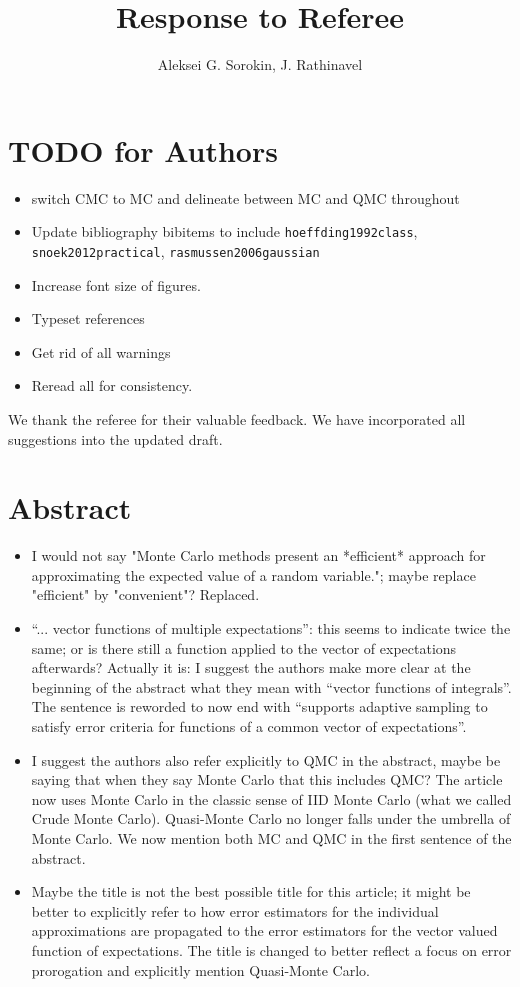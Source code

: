 \documentclass{article}[12pt]
\title{Response to Referee}
\author{Aleksei G. Sorokin, J. Rathinavel}
\date{}
\newcommand{\Referee}[1]{{\color{blue} #1 \newline}}
\newcommand{\MISCComment}[1]{{\color{purple} #1}}
\begin{document}
\maketitle    

\MISCComment{
    \section*{TODO for Authors}
    \begin{itemize}
        \item switch CMC to MC and delineate between MC and QMC throughout
        \item Update bibliography bibitems to include \texttt{hoeffding1992class}, \texttt{snoek2012practical}, \texttt{rasmussen2006gaussian}
        \item Increase font size of figures. 
        \item Typeset references 
        \item Get rid of all warnings 
        \item Reread all for consistency. 
    \end{itemize}}

We thank the referee for their valuable  feedback. We have incorporated all suggestions into the updated draft. 

\section*{Abstract}

\begin{itemize}
    \item \Referee{I would not say "Monte Carlo methods present an *efficient* approach for approximating the expected value of a random variable."; maybe replace "efficient" by "convenient"?}Replaced.
    \item \Referee{``... vector functions of multiple expectations'': this seems to indicate twice the same; or is there still a function applied to the vector of expectations afterwards? Actually it is: I suggest the authors make more clear at the beginning of the abstract what they mean with ``vector functions of integrals''.}The sentence is reworded to now end with ``supports adaptive sampling to satisfy error criteria for functions of a common vector of expectations''.
    \item \Referee{I suggest the authors also refer explicitly to QMC in the abstract, maybe be saying that when they say Monte Carlo that this includes QMC?}The article  now uses Monte Carlo in the classic sense of IID Monte Carlo (what we called Crude Monte Carlo). Quasi-Monte Carlo no longer falls under the umbrella of Monte Carlo.  We now mention both MC and QMC in the first sentence of the abstract. 
    \item \Referee{Maybe the title is not the best possible title for this article; it might be better to explicitly refer to how error estimators for the individual approximations are propagated to the error estimators for the vector valued function of expectations.}The title is changed to better reflect a focus on error prorogation and explicitly mention Quasi-Monte Carlo. 
\end{itemize}
\end{document}
